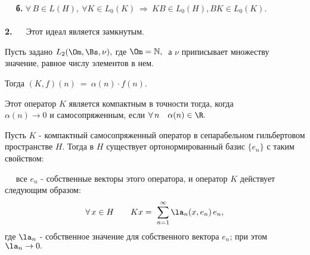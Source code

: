 \documentclass[a4paper]{article}
\newcommand{\sus}{\sum \limits_{n=1}^{\infty} }
\begin{document}
$\quad$ \textbf{б.} $\forall \, B \in L(H), \  \forall K\in L_0
(K)\ \Longrightarrow\ K B \in L_0 (H), B K\in L_0 (K).$\\
\\
\textbf{2.} $\quad$ Этот идеал является замкнутым.

\begin{ex}
Пусть задано $L_2 (\Om, \Bs, \nu),$ где $\Om =
\mathbb{N},\ $ а $\nu$ приписывает множеству значение, равное
числу элементов в нем.

Тогда $(K, f) (n)\ = \ \alpha(n) \cdot f(n).$
\end{ex}

\begin{problem}
Этот оператор $K$ является компактным в точности тогда, когда \\
$\alpha(n) \rightarrow 0$  и самосопряженным, если $\forall \, n
\quad \alpha(n) \in \R.$
\end{problem}

\begin{theorem}

Пусть $K$ - компактный самосопряженный оператор в сепарабельном
гильбертовом пространстве $H.$ Тогда в $H$ существует
ортонормированный базис $\{e_{n}\}$  с таким свойством:

$\quad$ все $e_{n}$ - собственные векторы этого оператора, и
оператор $K$ действует следующим образом:
$$
\forall\, x\in H \qquad Kx = \ \sus \la_n (x, e_n)\, e_n,
$$
где $\la_n$ - собственное значение для собственного вектора
$e_{n}$; при этом $\la_n \rightarrow 0.$
\end{theorem}
\end{document}
